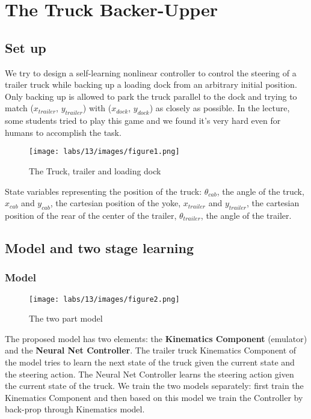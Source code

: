 \chapter{The Truck Backer-Upper}

\section{Set up}
We try to design a self-learning nonlinear controller to control the steering of a trailer truck while backing up a loading dock from an arbitrary initial position. Only backing up is allowed to park the truck parallel to the dock and trying to match ($x_{trailer}$, $y_{trailer}$) with ($x_{dock}$, $y_{dock}$) as closely as possible. In the lecture, some students tried to play this game and we found it's very hard even for humans to accomplish the task.
\\
\begin{figure}[H]
    \centering
    \texttt{[image: labs/13/images/figure1.png]}
    \caption{The Truck, trailer and loading dock}
    \label{fig:general}
\end{figure}
State variables representing the position of the truck: $\theta_{cab}$, the angle of the truck, $x_{cab}$ and $y_{cab}$, the cartesian position of the yoke, $x_{trailer}$ and $y_{trailer}$, the cartesian position of the rear of the center of the trailer, $\theta_{trailer}$, the angle of the trailer.

\section{Model and two stage learning}
\subsection{Model}
\begin{figure}[H]
    \centering
    \texttt{[image: labs/13/images/figure2.png]}
    \caption{The two part model}
    \label{fig:learn}
\end{figure}
The proposed model has two elements: the \textbf{Kinematics Component} (emulator) and the \textbf{Neural Net Controller}. The trailer truck Kinematics Component of the model tries to learn the next state of the truck given the current state and the steering action. The Neural Net Controller learns the steering action given the current state of the truck. We train the two models separately: first train the Kinematics Component and then based on this model we train the Controller by back-prop through Kinematics model.


